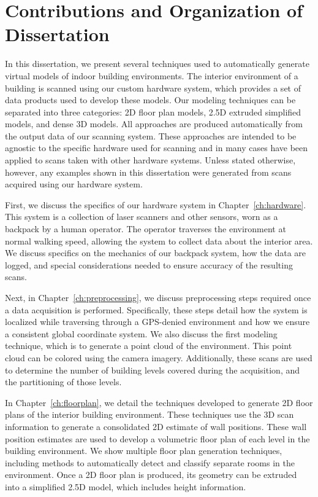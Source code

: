 \documentclass[12pt,onecolumn,oneside]{book}
\begin{document}
\section{Contributions and Organization of Dissertation}
\label{sec:organization}

In this dissertation, we present several techniques used to automatically generate virtual models of indoor building environments.  The interior environment of a building is scanned using our custom hardware system, which provides a set of data products used to develop these models.  Our modeling techniques can be separated into three categories:  2D floor plan models, 2.5D extruded simplified models, and dense 3D models.  All approaches are produced automatically from the output data of our scanning system.  These approaches are intended to be agnostic to the specific hardware used for scanning and in many cases have been applied to scans taken with other hardware systems.  Unless stated otherwise, however, any examples shown in this dissertation were generated from scans acquired using our hardware system.

First, we discuss the specifics of our hardware system in Chapter~\ref{ch:hardware}.  This system is a collection of laser scanners and other sensors, worn as a backpack by a human operator.  The operator traverses the environment at normal walking speed, allowing the system to collect data about the interior area.  We discuss specifics on the mechanics of our backpack system, how the data are logged, and special considerations needed to ensure accuracy of the resulting scans.

Next, in Chapter~\ref{ch:preprocessing}, we discuss preprocessing steps required once a data acquisition is performed.  Specifically, these steps detail how the system is localized while traversing through a GPS-denied environment and how we ensure a consistent global coordinate system.  We also discuss the first modeling technique, which is to generate a point cloud of the environment.  This point cloud can be colored using the camera imagery.  Additionally, these scans are used to determine the number of building levels covered during the acquisition, and the partitioning of those levels.

In Chapter~\ref{ch:floorplan}, we detail the techniques developed to generate 2D floor plans of the interior building environment.  These techniques use the 3D scan information to generate a consolidated 2D estimate of wall positions.  These wall position estimates are used to develop a volumetric floor plan of each level in the building environment.  We show multiple floor plan generation techniques, including methods to automatically detect and classify separate rooms in the environment.  Once a 2D floor plan is produced, its geometry can be extruded into a simplified 2.5D model, which includes height information.
\end{document}
